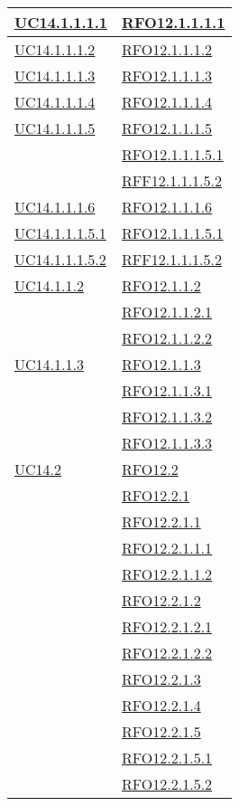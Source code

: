 \begin{longtable}{|>{\centering}m{5cm}|m{5cm}<{\centering}|}
\hyperlink{UC14.1.1.1.1}{UC14.1.1.1.1} & \hyperlink{RFO12.1.1.1.1}{RFO12.1.1.1.1}\\\hline
\hyperlink{UC14.1.1.1.2}{UC14.1.1.1.2} & \hyperlink{RFO12.1.1.1.2}{RFO12.1.1.1.2}\\\hline
\hyperlink{UC14.1.1.1.3}{UC14.1.1.1.3} & \hyperlink{RFO12.1.1.1.3}{RFO12.1.1.1.3}\\\hline
\hyperlink{UC14.1.1.1.4}{UC14.1.1.1.4} & \hyperlink{RFO12.1.1.1.4}{RFO12.1.1.1.4}\\\hline
\hyperlink{UC14.1.1.1.5}{UC14.1.1.1.5}
& \hyperlink{RFO12.1.1.1.5}{RFO12.1.1.1.5}\\
& \hyperlink{RFO12.1.1.1.5.1}{RFO12.1.1.1.5.1}\\
& \hyperlink{RFF12.1.1.1.5.2}{RFF12.1.1.1.5.2}\\\hline
\hyperlink{UC14.1.1.1.6}{UC14.1.1.1.6} & \hyperlink{RFO12.1.1.1.6}{RFO12.1.1.1.6}\\\hline

\hyperlink{UC14.1.1.1.5.1}{UC14.1.1.1.5.1} & \hyperlink{RFO12.1.1.1.5.1}{RFO12.1.1.1.5.1}\\\hline
\hyperlink{UC14.1.1.1.5.2}{UC14.1.1.1.5.2} & \hyperlink{RFF12.1.1.1.5.2}{RFF12.1.1.1.5.2}\\\hline

\hyperlink{UC14.1.1.2}{UC14.1.1.2}
& \hyperlink{RFO12.1.1.2}{RFO12.1.1.2}\\
& \hyperlink{RFO12.1.1.2.1}{RFO12.1.1.2.1}\\
& \hyperlink{RFO12.1.1.2.2}{RFO12.1.1.2.2}\\\hline

\hyperlink{UC14.1.1.3}{UC14.1.1.3}
& \hyperlink{RFO12.1.1.3}{RFO12.1.1.3}\\
& \hyperlink{RFO12.1.1.3.1}{RFO12.1.1.3.1}\\
& \hyperlink{RFO12.1.1.3.2}{RFO12.1.1.3.2}\\
& \hyperlink{RFO12.1.1.3.3}{RFO12.1.1.3.3}\\\hline

\hyperlink{UC14.2}{UC14.2} 
& \hyperlink{RFO12.2}{RFO12.2}\\
& \hyperlink{RFO12.2.1}{RFO12.2.1}\\
& \hyperlink{RFO12.2.1.1}{RFO12.2.1.1}\\
& \hyperlink{RFO12.2.1.1.1}{RFO12.2.1.1.1}\\
& \hyperlink{RFO12.2.1.1.2}{RFO12.2.1.1.2}\\
& \hyperlink{RFO12.2.1.2}{RFO12.2.1.2}\\
& \hyperlink{RFO12.2.1.2.1}{RFO12.2.1.2.1}\\
& \hyperlink{RFO12.2.1.2.2}{RFO12.2.1.2.2}\\
& \hyperlink{RFO12.2.1.3}{RFO12.2.1.3}\\
& \hyperlink{RFO12.2.1.4}{RFO12.2.1.4}\\
& \hyperlink{RFO12.2.1.5}{RFO12.2.1.5}\\
& \hyperlink{RFO12.2.1.5.1}{RFO12.2.1.5.1}\\
& \hyperlink{RFO12.2.1.5.2}{RFO12.2.1.5.2}\\\hline


\end{longtable}
